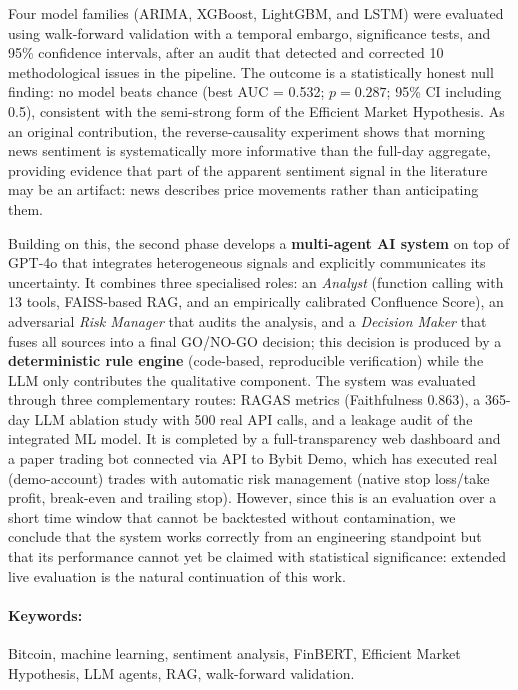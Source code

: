 \documentclass[12pt, a4paper]{report}
\begin{document}
Four model families (ARIMA, XGBoost, LightGBM, and LSTM) were evaluated using walk-forward validation with a temporal embargo, significance tests, and 95\% confidence intervals, after an audit that detected and corrected 10 methodological issues in the pipeline. The outcome is a statistically honest null finding: no model beats chance (best AUC = 0.532; $p = 0.287$; 95\% CI including 0.5), consistent with the semi-strong form of the Efficient Market Hypothesis. As an original contribution, the reverse-causality experiment shows that morning news sentiment is systematically more informative than the full-day aggregate, providing evidence that part of the apparent sentiment signal in the literature may be an artifact: news describes price movements rather than anticipating them.

Building on this, the second phase develops a \textbf{multi-agent AI system} on top of GPT-4o that integrates heterogeneous signals and explicitly communicates its uncertainty. It combines three specialised roles: an \textit{Analyst} (function calling with 13 tools, FAISS-based RAG, and an empirically calibrated Confluence Score), an adversarial \textit{Risk Manager} that audits the analysis, and a \textit{Decision Maker} that fuses all sources into a final GO/NO-GO decision; this decision is produced by a \textbf{deterministic rule engine} (code-based, reproducible verification) while the LLM only contributes the qualitative component. The system was evaluated through three complementary routes: RAGAS metrics (Faithfulness 0.863), a 365-day LLM ablation study with 500 real API calls, and a leakage audit of the integrated ML model. It is completed by a full-transparency web dashboard and a paper trading bot connected via API to Bybit Demo, which has executed real (demo-account) trades with automatic risk management (native stop loss/take profit, break-even and trailing stop). However, since this is an evaluation over a short time window that cannot be backtested without contamination, we conclude that the system works correctly from an engineering standpoint but that its performance cannot yet be claimed with statistical significance: extended live evaluation is the natural continuation of this work.

\paragraph{Keywords:} Bitcoin, machine learning, sentiment analysis, FinBERT, Efficient Market Hypothesis, LLM agents, RAG, walk-forward validation.
\endgroup
\end{document}
